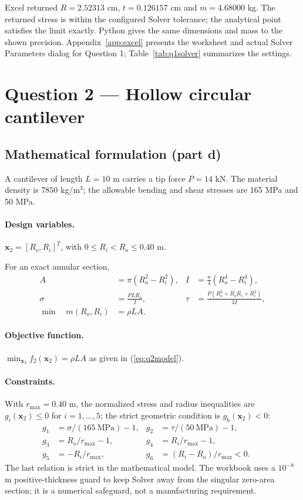 \documentclass[11pt,a4paper]{article}
\begin{document}
Excel returned $R=2.52313$ cm, $t=0.126157$ cm and $m=4.68000$ kg. The returned stress is within the configured Solver tolerance; the analytical point satisfies the limit exactly. Python gives the same dimensions and mass to the shown precision. Appendix~\ref{app:excel} presents the worksheet and actual Solver Parameters dialog for Question 1; Table~\ref{tab:q1solver} summarizes the settings.

\clearpage
\section{Question 2 --- Hollow circular cantilever}
\subsection{Mathematical formulation (part d)}
A cantilever of length $L=10$ m carries a tip force $P=14$ kN. The material density is $7850$ kg/m$^3$; the allowable bending and shear stresses are 165 MPa and 50 MPa.

\paragraph{Design variables.} $\mathbf{x}_2=[R_o,R_i]^T$, with $0\le R_i<R_o\le0.40$ m.

For an exact annular section,
\begin{align}
A&=\pi(R_o^2-R_i^2),& I&=\frac{\pi}{4}(R_o^4-R_i^4),\\
\sigma&=\frac{PLR_o}{I},&
\tau&=\frac{P(R_o^2+R_oR_i+R_i^2)}{3I},\\
\min\quad m(R_o,R_i)&=\rho LA.&&\label{eq:q2model}
\end{align}
\paragraph{Objective function.} $\min_{\mathbf{x}_2} f_2(\mathbf{x}_2)=\rho L A$ as given in (\ref{eq:q2model}).

\paragraph{Constraints.} With $r_{\max}=0.40$ m, the normalized stress and radius inequalities are $g_i(\mathbf{x}_2)\le0$ for $i=1,\ldots,5$; the strict geometric condition is $g_6(\mathbf{x}_2)<0$:
\begin{align}
g_1&=\sigma/(165\ \mathrm{MPa})-1,&g_2&=\tau/(50\ \mathrm{MPa})-1,\\
g_3&=R_o/r_{\max}-1,&g_4&=R_i/r_{\max}-1,\\
g_5&=-R_i/r_{\max},&g_6&=(R_i-R_o)/r_{\max}<0.&&\label{eq:q2constraints}
\end{align}
The last relation is strict in the mathematical model. The workbook uses a $10^{-8}$ m positive-thickness guard to keep Solver away from the singular zero-area section; it is a numerical safeguard, not a manufacturing requirement.
\end{document}

